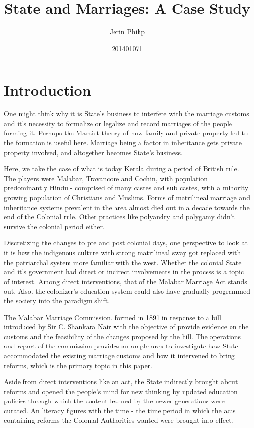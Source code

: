 \documentclass[a4paper]{article}
\title{State and Marriages: A Case Study}
\author{Jerin Philip}
\date{201401071}
\begin{document}
\maketitle
\tableofcontents

\section{Introduction}
One might think why it is State's business to
interfere with the marriage customs and it's
necessity to formalize or legalize and record
marriages of the people forming it. Perhaps the
Marxist theory of how family and private property
led to the formation is useful here. Marriage
being a factor in inheritance gets private
property involved, and altogether becomes State's
business.

Here, we take the case of what is today Kerala
during a period of British rule. The players were
Malabar, Travancore and Cochin, with population
predominantly Hindu - comprised of many castes and
sub castes, with a minority growing population of
Christians and Muslims. Forms of matrilineal
marriage and inheritance systems prevalent in the
area almost died out in a decade towards the end
of the Colonial rule. Other practices like
polyandry and polygamy didn't survive the colonial
period either.

Discretizing the changes to pre and post colonial
days, one perspective to look at it is how the
indigenous culture with strong matrilineal sway
got replaced with the patriarchal system more
familiar with the west. Whether the colonial State
and it's government had direct or indirect
involvements in the process is a topic of
interest. Among direct interventions, that of the
Malabar Marriage Act stands out. Also, the
colonizer's education system could also have
gradually programmed the society into the paradigm
shift.

The Malabar Marriage Commission, formed in 1891 in
response to a bill introduced by Sir C. Shankara
Nair \cite[1]{menon1894report} with the objective
of provide evidence on the customs and the
feasibility of the changes proposed by the
bill\cite[3]{menon1894report}. The operations and
report of the commission provides an ample area to
investigate how State accommodated the existing
marriage customs and how it intervened to bring
reforms, which is the primary topic in this paper.

Aside from direct interventions like an act, the
State indirectly brought about reforms and opened
the people's mind for new thinking by updated
education policies through which the content
learned by the newer generations were curated. An
literacy figures with the time - the time period
in which the acts containing reforms the Colonial
Authorities wanted were brought into effect.
\end{document}
